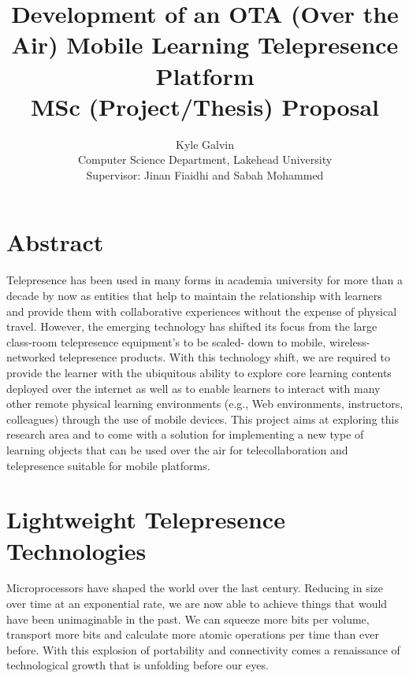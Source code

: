 \documentclass[a4paper,12pt]{report}
\begin{document}
\begin{titlepage}
	\title{Development of an OTA (Over the Air) Mobile Learning Telepresence Platform\\ MSc (Project/Thesis) Proposal}
	\author{Kyle Galvin\\ Computer Science Department, Lakehead University\\ Supervisor: Jinan Fiaidhi and Sabah Mohammed}
\end{titlepage}

\maketitle

\tableofcontents

\chapter*{\centering Abstract}
Telepresence has been used in many forms in academia university for more than a decade by now as entities that help to maintain the relationship with learners and provide them with collaborative experiences without the expense of physical travel. However, the emerging technology has shifted its focus from the large class-room telepresence equipment’s to be scaled- down to mobile, wireless-networked telepresence products. With this technology shift, we are required to provide the learner with the ubiquitous ability to explore core learning contents deployed over the internet as well as to enable learners to interact with many other remote physical learning environments (e.g., Web environments, instructors, colleagues) through the use of mobile devices. This project aims at exploring this research area and to come with a solution for implementing a new type of learning objects that can be used over the air for telecollaboration and telepresence suitable for mobile platforms. 

\chapter{Lightweight Telepresence Technologies}
Microprocessors have shaped the world over the last century. Reducing in size over time at an exponential rate, we are now able to achieve things that would have been unimaginable in the past. We can squeeze more bits per volume, transport more bits and calculate more atomic operations per time than ever before. With this explosion of portability and connectivity comes a renaissance of technological growth that is unfolding before our eyes.
\end{document}
